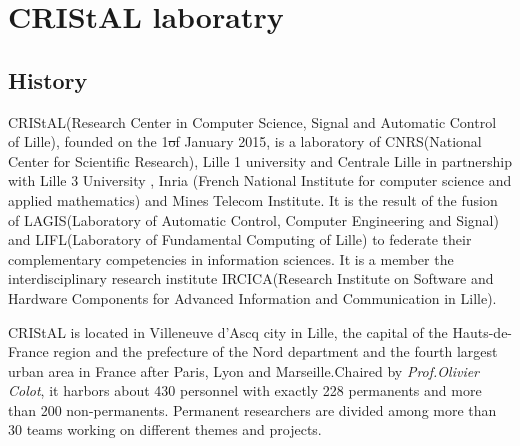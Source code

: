 \chapter{CRIStAL laboratry}

\section{History}

CRIStAL\footnotemark[1] (Research Center in Computer Science, Signal and Automatic Control of Lille), founded on the 1\st of January 2015, is a laboratory of CNRS\footnotemark[2] (National Center for Scientific Research), Lille 1 university and Centrale Lille in partnership with Lille 3 University , Inria (French National Institute for computer science and applied mathematics) and Mines Telecom Institute. It is the result of the fusion of LAGIS\footnotemark[4] (Laboratory of Automatic Control, Computer Engineering and Signal) and LIFL\footnotemark[4] (Laboratory of Fundamental Computing of Lille) to federate their complementary competencies in information sciences. It is a member the interdisciplinary research institute IRCICA\footnotemark[5] (Research Institute on Software and Hardware Components for Advanced Information and Communication in Lille). \\






CRIStAL is located in Villeneuve d'Ascq city in Lille, the capital of  the Hauts-de-France region and the prefecture of the Nord department and the fourth largest urban area in France after Paris, Lyon and Marseille.Chaired by \textit{Prof.Olivier Colot}, it harbors about 430 personnel with exactly 228 permanents and more than 200 non-permanents. Permanent researchers are divided among more than 30 teams working on different themes and projects.

